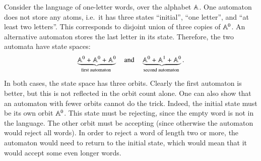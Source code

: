 {
    Consider the language of one-letter words, over the alphabet $\mathbb A$. One automaton does not store any atoms, i.e.~it has three states ``initial'', ``one letter'', and ``at least two letters''. This corresponds to disjoint union of three copies of $\mathbb A^0$. 
    An alternative automaton stores the last letter in its state. Therefore, the two automata have state spaces: 
    \begin{align}
        \myunderbrace{\atoms^0 + \atoms^0 + \atoms^0}{first automaton}
        \quad \text{and} \quad
        \myunderbrace{\atoms^0 + \atoms^1 + \atoms^0}{second automaton}.
    \end{align}
    In both cases, the state space has three orbits. Clearly the first automaton is better, but this is not reflected in the orbit count alone. One can also show that an automaton with fewer orbits cannot do the trick. Indeed, the initial state must be its own orbit $\mathbb A^0$. This state must be rejecting, since the empty word is not in the language. The other orbit must be accepting (since otherwise the automaton would reject all words). In order to reject a word of length two or more, the automaton would need to return to the initial state, which would mean that it would accept some even longer words.
}
